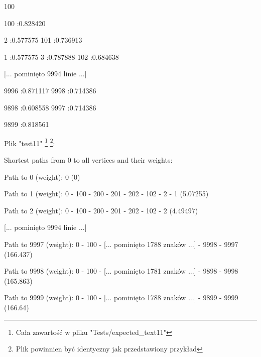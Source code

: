 \documentclass[11pt,a4paper]{report}
\newenvironment{multiconsole}{\begingroup\fontfamily{qcr}\selectfont}{\endgroup}
\begin{document}
    \begin{multiconsole}
        100 100

        \hspace{2em}100 :0.828420

        \hspace{2em}2 :0.577575  101 :0.736913 

        \hspace{2em}1 :0.577575  3 :0.787888  102 :0.684638 

        [... pominięto 9994 linie ...]

        \hspace{2em}9996 :0.871117  9998 :0.714386

        \hspace{2em}9898 :0.608558  9997 :0.714386 

        \hspace{2em}9899 :0.818561 

    \end{multiconsole}

    \vspace{1em}

    Plik "test11" \footnote{Cała zawartość w pliku "Tests/expected\_text11"} \footnote{Plik powinnien być identyczny jak przedstawiony przykład}:

    \begin{multiconsole}
        Shortest paths from 0 to all vertices and their weights:

        

        Path to 0 (weight): 0 (0) 

        Path to 1 (weight): 0 - 100 - 200 - 201 - 202 - 102 - 2 - 1 (5.07255)

        Path to 2 (weight): 0 - 100 - 200 - 201 - 202 - 102 - 2 (4.49497)

        [... pominięto 9994 linie ...]

        Path to 9997 (weight): 0 - 100 - [... pominięto 1788 znaków ...] - 9998 - 9997 (166.437)

        Path to 9998 (weight): 0 - 100 - [... pominięto 1781 znaków ...] - 9898 - 9998 (165.863)

        Path to 9999 (weight): 0 - 100 - [... pominięto 1788 znaków ...] - 9899 - 9999 (166.64)
    \end{multiconsole}
\end{document}
